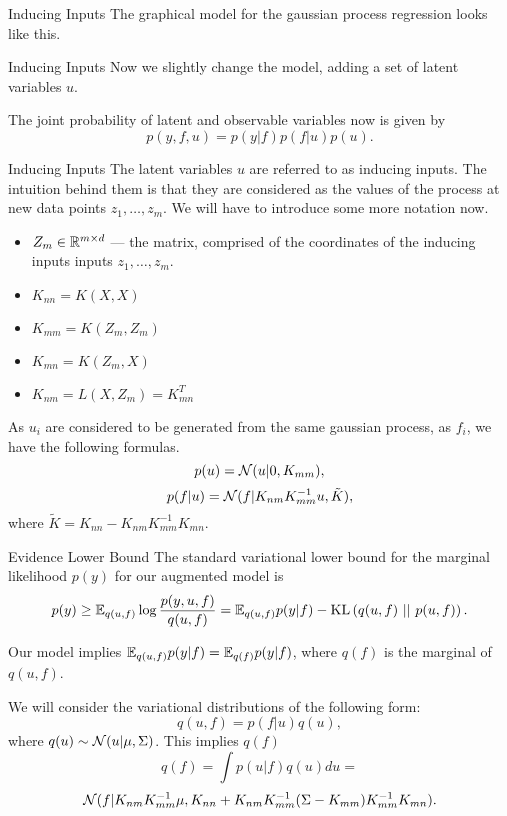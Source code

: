 \begin{frame}{Inducing Inputs}
			The graphical model for the gaussian process regression looks like this.
			\begin{figure}[!h]
				\centering
				\subfloat{
					\scalebox{0.5}{
						
					}
				}
			\end{figure}
		\end{frame}

		\begin{frame}{Inducing Inputs}
			Now we slightly change the model, adding a set of latent variables $u$.
			\begin{figure}[!h]
				\centering
				\subfloat{
					\scalebox{0.5}{
						
					}
				}
			\end{figure}
			The joint probability of latent and observable variables now is given by
			$$p(y, f, u) = p(y | f) p(f | u) p(u).$$
		\end{frame}

		\begin{frame}{Inducing Inputs}
			The latent variables $u$ are referred to as inducing inputs. The intuition behind them is that they are considered as the values of the process at new data points $z_1, \ldots, z_m$. We will have to introduce some more notation now.

			\begin{itemize}
				\item $Z_m \in \mathbb{R}^{m \times d}$ — the matrix, comprised of the coordinates of the inducing inputs inputs $z_1, \ldots, z_m$.
				\item $K_{nn} = K(X, X)$
				\item $K_{mm} = K(Z_m, Z_m)$
				\item $K_{mn} = K(Z_m, X)$
				\item $K_{nm} = L(X, Z_m) = K_{mn}^T$ 
			\end{itemize}
			As $u_i$ are considered to be generated from the same gaussian process, as $f_i$, we have the following formulas.
			$$p(u) = \mathcal{N}(u|0, K_{mm}),$$
			$$p(f|u) = \mathcal{N} (f|K_{nm} K_{mm}^{-1}u, \tilde K),$$
			where $\tilde K = K_{nn} - K_{nm} K_{mm}^{-1} K_{mn}.$
		\end{frame}

		\begin{frame}{Evidence Lower Bound}
			The standard variational lower bound for the marginal likelihood $p(y)$ for our augmented model is
			$$p(y) \ge \mathbb{E}_{q(u, f)} \log \frac {p(y, u, f)}{q(u, f)} = \mathbb{E}_{q(u, f)} p(y | f) - \mbox{KL}\left(q(u, f)\mbox{ || }p(u, f)\right).$$

			Our model implies $\mathbb{E}_{q(u, f)} p(y | f) = \mathbb{E}_{q(f)} p(y | f)$, where $q(f)$ is the marginal of $q(u, f)$.

			We will consider the variational distributions of the following form:
			$$q(u, f) = p(f | u) q(u),$$
			where $q(u) \sim \mathcal{N}(u|\mu, \Sigma)$. This implies $q(f)$
			$$q(f) = \int p(u | f) q(u) du = $$
			$$\mathcal{N}(f| K_{nm} K_{mm}^{-1} \mu, K_{nn} + K_{nm} K_{mm}^{-1}(\Sigma - K_{mm}) K_{mm}^{-1} K_{mn}).$$
		\end{frame}

